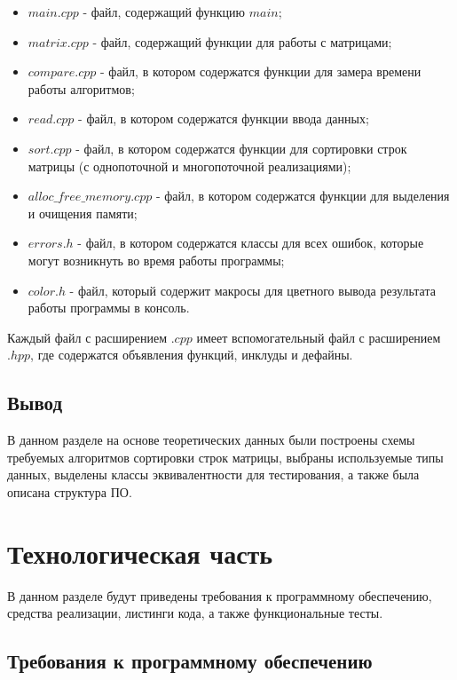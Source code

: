 \documentclass[a4paper,14pt, unknownkeysallowed]{extreport}
\begin{document}
\begin{itemize}
	\item $main.cpp$ - файл, содержащий функцию $main$;
    \item $matrix.cpp$ - файл, содержащий функции для работы с матрицами;
    \item $compare.cpp$ - файл, в котором содержатся функции для замера времени работы алгоритмов;
    \item $read.cpp$ - файл, в котором содержатся функции ввода данных;
    \item $sort.cpp$ - файл, в котором содержатся функции для сортировки строк матрицы (с однопоточной и многопоточной реализациями);
    \item $alloc\_free\_memory.cpp$ - файл, в котором содержатся функции для выделения и очищения памяти;
    \item $errors.h$ - файл, в котором содержатся классы для всех ошибок, которые могут возникнуть во время работы программы;
    \item $color.h$ - файл, который содержит макросы для цветного вывода результата работы программы в консоль.
\end{itemize}

Каждый файл с расширением $.cpp$ имеет вспомогательный файл с расширением $.hpp$, где содержатся объявления функций, инклуды и дефайны.

\section{Вывод}

В данном разделе на основе теоретических данных были построены схемы требуемых алгоритмов сортировки строк матрицы, выбраны используемые типы данных, выделены классы эквивалентности для тестирования, а также была описана структура ПО.

\clearpage





\chapter{Технологическая часть}

В данном разделе будут приведены требования к программному обеспечению, средства реализации, листинги кода, а также функциональные тесты.

\section{Требования к программному обеспечению}
\end{document}
